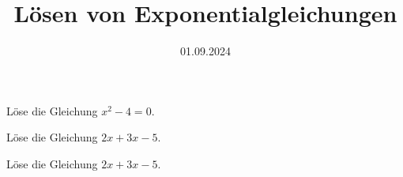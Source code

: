 \documentclass[points=left, 
solution,
12pt
]{exam}
\date{01.09.2024}
\title{Lösen von Exponentialgleichungen}
\begin{document}
Löse die Gleichung \(x^2 - 4 = 0\). \\
\lipsum[1]

Löse die Gleichung \(2x + 3x - 5\).

Löse die Gleichung \(2x + 3x - 5\).
\thinkbubble[Test]


\totalpoints
\end{document}
